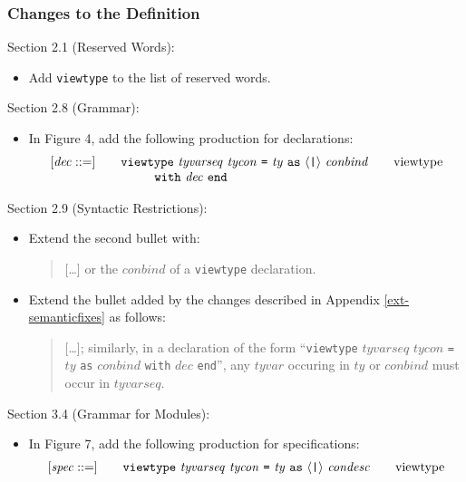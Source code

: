 \documentclass[twoside,titlepage]{article}
\begin{document}
\begin{appendix}
\subsubsection*{Changes to the Definition}

Section 2.1 (Reserved Words):
\begin{itemize}
\item Add {\tt viewtype} to the list of reserved words.
\end{itemize}

Section 2.8 (Grammar):
\begin{itemize}
\item In Figure 4, add the following production for declarations:
  $$
  \begin{array}{l@{\qquad}l@{\qquad}l}
  [\mathit{dec} ::=] & {\tt{viewtype}}~\mathit{tyvarseq}~\mathit{tycon}~\mbox{\tt=}~\mathit{ty}~{\tt{as}}~\langle\mbox{\tt|}\rangle~\mathit{conbind} & \textrm{viewtype} \\
  & ~~~~~~~~{\tt{with}}~\mathit{dec}~{\tt{end}}
  \end{array}
  $$
\end{itemize}

Section 2.9 (Syntactic Restrictions):
\begin{itemize}
\item Extend the second bullet with:
  \begin{quote}
  [\dots] or the $\mathit{conbind}$ of a {\tt viewtype} declaration.
  \end{quote}

\item Extend the bullet added by the changes described in Appendix \ref{ext-semanticfixes} as follows:
  \begin{quote}
  [\dots]; similarly, in a declaration of the form ``{\tt{viewtype}} $\mathit{tyvarseq}$ $\mathit{tycon}$ {\tt=} $\mathit{ty}$ {\tt as} $\mathit{conbind}$ {\tt with} $\mathit{dec}$ {\tt end}'', any $\mathit{tyvar}$ occuring in $\mathit{ty}$ or $\mathit{conbind}$ must occur in $\mathit{tyvarseq}$.
  \end{quote}
\end{itemize}

Section 3.4 (Grammar for Modules):
\begin{itemize}
\item In Figure 7, add the following production for specifications:
  $$
  \begin{array}{l@{\qquad}l@{\qquad}l}
  [\mathit{spec} ::=] & {\tt{viewtype}}~\mathit{tyvarseq}~\mathit{tycon}~\mbox{\tt=}~\mathit{ty}~{\tt{as}}~\langle\mbox{\tt|}\rangle~\mathit{condesc} & \textrm{viewtype}
  \end{array}
  $$
\end{itemize}


\end{appendix}
\end{document}
